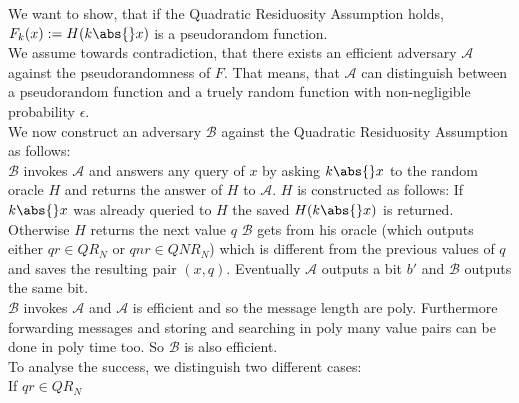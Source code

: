 We want to show, that if the Quadratic Residuosity Assumption holds, \(F_k(x) := H (k \abs{} x)\) is a pseudorandom function.\\
We assume towards contradiction, that there exists an efficient adversary \(\mathcal{A}\) against the pseudorandomness of \(F\). That means, that \(\mathcal{A}\) can distinguish between a pseudorandom function and a truely random function with non-negligible probability \(\epsilon\).\\
We now construct an adversary \(\mathcal{B}\) against the Quadratic Residuosity Assumption as follows:\\
\(\mathcal{B}\) invokes \(\mathcal{A}\) and answers any query of \(x\) by asking \(k \abs{} x\) to the random oracle \(H\) and returns the answer of \(H\) to \(\mathcal{A}\). \(H\) is constructed as follows: If \(k \abs{} x\) was already queried to \(H\) the saved \(H(k \abs{} x)\) is returned. Otherwise \(H\) returns the next value \(q\) \(\mathcal{B}\) gets from his oracle (which outputs either \(qr \in QR_N\) or \(qnr \in QNR_N\)) which is different from the previous values of \(q\) and saves the resulting pair \((x, q)\).
Eventually \(\mathcal{A}\) outputs a bit \(b'\) and \(\mathcal{B}\) outputs the same bit.\\
\(\mathcal{B}\) invokes \(\mathcal{A}\) and \(\mathcal{A}\) is efficient and so the message length are poly. Furthermore forwarding messages and storing and searching in poly many value pairs can be done in poly time too. So \(\mathcal{B}\) is also efficient.\\
To analyse the success, we distinguish two different cases:\\
If \(qr \in QR_N\) 
 